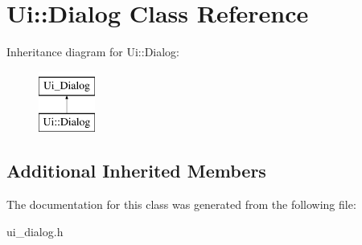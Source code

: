 \hypertarget{classUi_1_1Dialog}{\section{Ui\-:\-:Dialog Class Reference}
\label{classUi_1_1Dialog}
}
Inheritance diagram for Ui\-:\-:Dialog\-:\begin{figure}[H]
\begin{center}
\leavevmode
\includegraphics[height=2.000000cm]{classUi_1_1Dialog}
\end{center}
\end{figure}
\subsection*{Additional Inherited Members}


The documentation for this class was generated from the following file\-:\begin{DoxyCompactItemize}
\item 
ui\-\_\-dialog.\-h\end{DoxyCompactItemize}
